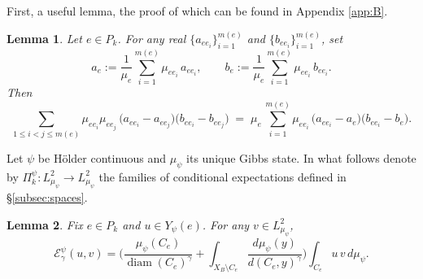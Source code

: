 \documentclass[12pt]{amsart}
\theoremstyle{plain}
\newtheorem{lemma}{Lemma}[section]
\theoremstyle{definition}
\begin{document}
First, a useful lemma, the proof of which can be found in Appendix \ref{app:B}.
\begin{lemma}
\label{lem:polar-cylinder}
Let $e\in P_k$. For any real $\{a_{ee_i}\}_{i=1}^{m(e)}$ and $\{b_{ee_i}\}_{i=1}^{m(e)}$, set
\[
a_e:=\frac{1}{\mu_e}\sum_{i=1}^{m(e)}\mu_{ee_i}\,a_{ee_i},\qquad
b_e:=\frac{1}{\mu_e}\sum_{i=1}^{m(e)}\mu_{ee_i}\,b_{ee_i}.
\]
Then
\begin{equation}
\label{eq:polar-cylinder}
\sum_{1\le i<j\le m(e)} \mu_{ee_i}\mu_{ee_j}\,\big(a_{ee_i}-a_{ee_j}\big)\big(b_{ee_i}-b_{ee_j}\big)
\;=\;
\mu_e\,\sum_{i=1}^{m(e)} \mu_{ee_i}\,\big(a_{ee_i}-a_e\big)\big(b_{ee_i}-b_e\big).
\end{equation}
\end{lemma}
Let $\psi$ be H\"older continuous and $\mu_\psi$ its unique Gibbs state. In what follows denote by $\Pi_k^\psi:L^2_{\mu_\psi}\rightarrow L^2_{\mu_\psi}$ the families of conditional expectations defined in \S \ref{subsec:spaces}.
\begin{lemma}
\label{lem:diag-cylinder}
Fix $e\in P_k$ and $u\in Y_\psi(e)$. For any $v\in L^2_{\mu_\psi}$,
\begin{equation}
\label{eq:diag-cylinder}
\mathcal{E}^\psi_\gamma(u,v)
=
\Bigg(\frac{\mu_\psi(C_e)}{\operatorname{diam}(C_e)^\gamma}
+\int_{X_B\setminus C_e}\frac{d\mu_\psi(y)}{d(C_e,y)^\gamma}\Bigg)\int_{C_e} u\,v\,d\mu_\psi.
\end{equation}
\end{lemma}
\end{document}
